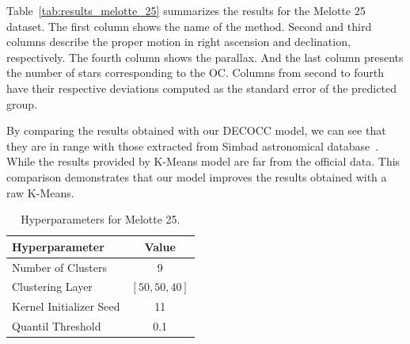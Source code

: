 \documentclass[11pt,a4paper,english,twocolumn]{article}
\begin{document}
\begin{table}[!htbp]
  \begin{center}
    \caption{Summary for the Melotte 25 results.}
    \label{tab:results_melotte_25}
  \end{center}
\end{table}

Table~\ref{tab:results_melotte_25} summarizes the results for the Melotte 25 dataset. The first column
shows the name of the method. Second and third columns describe the proper motion in right ascension and
declination, respectively. The fourth column shows the parallax. And the last column presents the number
of stars corresponding to the OC. Columns from second to fourth have their respective deviations computed
as the standard error of the predicted group.

By comparing the results obtained with our DECOCC model, we can see that they are in range with those
extracted from Simbad astronomical database~\cite{wenger2000simbad}. While the results provided by K-Means
model are far from the official data. This comparison demonstrates that our model improves the results
obtained with a raw K-Means.

\begin{table}[!htb]
  \begin{center}
    \begin{tabular}{l|c}
      \textbf{Hyperparameter} & \textbf{Value} \\
      \hline
      Number of Clusters & 9 \\
      Clustering Layer & \(\left[ 50, 50, 40 \right]\) \\
      Kernel Initializer Seed & 11 \\
      Quantil Threshold & 0.1 \\
    \end{tabular}
    \caption{Hyperparameters for Melotte 25.}
    \label{tab:hyperparameters_melotte_25}
  \end{center}
\end{table}
\end{document}
